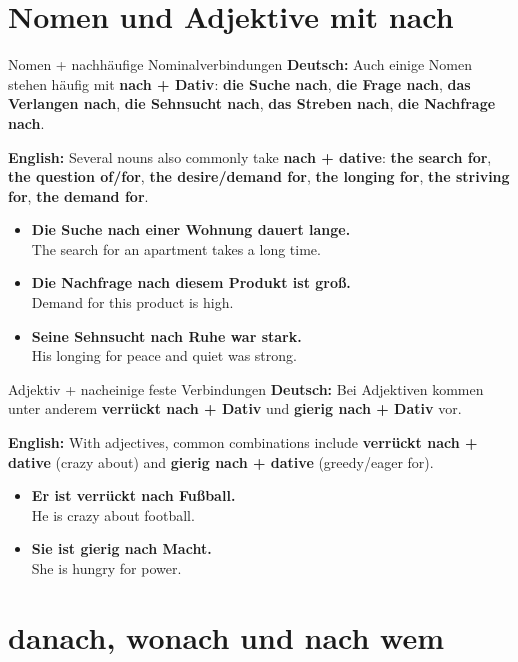\documentclass[a4paper,11pt]{article}
\newcommand{\GermanText}[1]{\textbf{Deutsch: }#1\par}
\newcommand{\EnglishText}[1]{{\small\color{SoftGray}\textbf{English: }#1\par}}
\newcommand{\ExampleItem}[2]{\item \textbf{#1}\\{\small\color{SoftGray}#2}}
\begin{document}
    \section{Nomen und Adjektive mit nach}

        \begin{grammarentry}{Nomen + nach}{häufige Nominalverbindungen}
            \GermanText{Auch einige Nomen stehen häufig mit \textbf{nach + Dativ}: \textbf{die Suche nach}, \textbf{die Frage nach}, \textbf{das Verlangen nach}, \textbf{die Sehnsucht nach}, \textbf{das Streben nach}, \textbf{die Nachfrage nach}.}
            \EnglishText{Several nouns also commonly take \textbf{nach + dative}: \textbf{the search for}, \textbf{the question of/for}, \textbf{the desire/demand for}, \textbf{the longing for}, \textbf{the striving for}, \textbf{the demand for}.}
        \end{grammarentry}

        \begin{exbox}
            \begin{itemize}
                \ExampleItem{Die Suche nach einer Wohnung dauert lange.}{The search for an apartment takes a long time.}
                \ExampleItem{Die Nachfrage nach diesem Produkt ist groß.}{Demand for this product is high.}
                \ExampleItem{Seine Sehnsucht nach Ruhe war stark.}{His longing for peace and quiet was strong.}
            \end{itemize}
        \end{exbox}

        \begin{grammarentry}{Adjektiv + nach}{einige feste Verbindungen}
            \GermanText{Bei Adjektiven kommen unter anderem \textbf{verrückt nach + Dativ} und \textbf{gierig nach + Dativ} vor.}
            \EnglishText{With adjectives, common combinations include \textbf{verrückt nach + dative} (crazy about) and \textbf{gierig nach + dative} (greedy/eager for).}
        \end{grammarentry}

        \begin{exbox}
            \begin{itemize}
                \ExampleItem{Er ist verrückt nach Fußball.}{He is crazy about football.}
                \ExampleItem{Sie ist gierig nach Macht.}{She is hungry for power.}
            \end{itemize}
        \end{exbox}


    \section{danach, wonach und nach wem}
\end{document}
